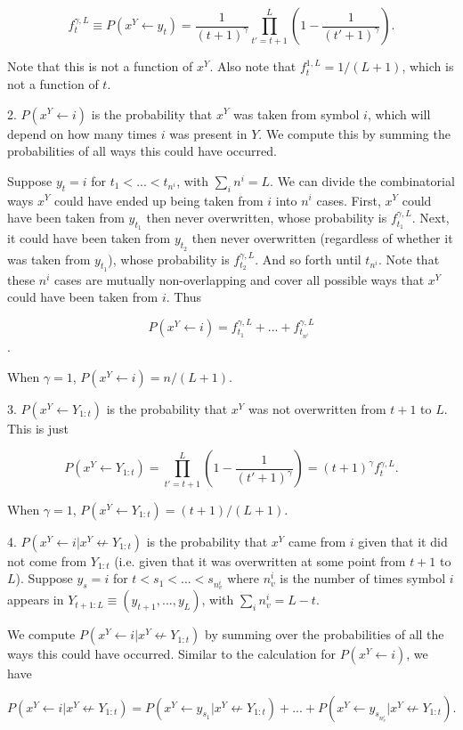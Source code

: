 \documentclass{article}
\begin{document}
$$f^{\gamma,L}_t \equiv P(x^Y \leftarrow y_t) = \frac{1}{(t+1)^\gamma}\prod\limits_{t' = t+1}^L\left(1 - \frac{1}{(t'+1)^\gamma}\right).$$

Note that this is not a function of $x^Y$. Also note that $f^{1,L}_t = 1/(L+1)$, which is not a function of $t$.

2. $P(x^Y \leftarrow i)$ is the probability that $x^Y$ was taken from symbol $i$, which will depend on how many times $i$ was present in $Y$. We compute this by summing the probabilities of all ways this could have occurred.

Suppose $y_t = i$ for $t_1 < ... < t_{n^i}$, with $\sum_i n^i = L$. We can divide the combinatorial ways $x^Y$ could have ended up being taken from $i$ into $n^i$ cases. First, $x^Y$ could have been taken from $y_{t_1}$ then never overwritten, whose probability is $f^{\gamma,L}_{t_1}$. Next, it could have been taken from $y_{t_2}$ then never overwritten (regardless of whether it was taken from $y_{t_1}$), whose probability is $f^{\gamma,L}_{t_2}$. And so forth until $t_{n^i}$. Note that these $n^i$ cases are mutually non-overlapping and cover all possible ways that $x^Y$ could have been taken from $i$. Thus

$$P(x^Y \leftarrow i) = f^{\gamma,L}_{t_1} + ... + f^{\gamma,L}_{t_{n^i}}$$.

When $\gamma = 1$, $P(x^Y \leftarrow i) = n/(L+1)$.

3. $P(x^Y \leftarrow Y_{1:t})$ is the probability that $x^Y$ was not overwritten from $t+1$ to $L$. This is just

$$P(x^Y \leftarrow Y_{1:t}) = \prod\limits_{t' = t+1}^L \left(1 - \frac{1}{(t'+1)^\gamma}\right) = (t+1)^\gamma f^{\gamma,L}_t.$$

When $\gamma = 1$, $P(x^Y \leftarrow Y_{1:t}) = (t+1)/(L+1)$.

4. $P(x^Y \leftarrow i|x^Y \not \leftarrow Y_{1:t})$ is the probability that $x^Y$ came from $i$ given that it did not come from $Y_{1:t}$ (i.e. given that it was overwritten at some point from $t+1$ to $L$). Suppose $y_s = i$ for $t < s_1 < ... < s_{n^i_v}$ where $n^i_v$ is the number of times symbol $i$ appears in $Y_{t+1:L} \equiv (y_{t+1}, ..., y_L)$, with $\sum\limits_i n^i_v = L-t$.

We compute $P(x^Y \leftarrow i|x^Y \not \leftarrow Y_{1:t})$ by summing over the probabilities of all the ways this could have occurred. Similar to the calculation for $P(x^Y \leftarrow i)$, we have

$$P(x^Y \leftarrow i|x^Y \not \leftarrow Y_{1:t}) = P(x^Y \leftarrow y_{s_1}| x^Y \not \leftarrow Y_{1:t}) + ... + P(x^Y \leftarrow y_{s_{n^i_v}}| x^Y \not \leftarrow Y_{1:t}).$$
\end{document}
